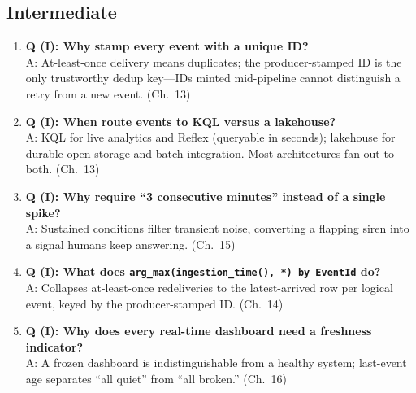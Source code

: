 \subsection*{Intermediate}
\begin{enumerate}
    \item \textbf{Q (I): Why stamp every event with a unique ID?}\\
    A: At-least-once delivery means duplicates; the producer-stamped ID is the only trustworthy
    dedup key---IDs minted mid-pipeline cannot distinguish a retry from a new event. (Ch.~13)
    \item \textbf{Q (I): When route events to KQL versus a lakehouse?}\\
    A: KQL for live analytics and Reflex (queryable in seconds); lakehouse for durable open
    storage and batch integration. Most architectures fan out to both. (Ch.~13)
    \item \textbf{Q (I): Why require ``3 consecutive minutes'' instead of a single spike?}\\
    A: Sustained conditions filter transient noise, converting a flapping siren into a signal
    humans keep answering. (Ch.~15)
    \item \textbf{Q (I): What does \texttt{arg\_max(ingestion\_time(), *) by EventId} do?}\\
    A: Collapses at-least-once redeliveries to the latest-arrived row per logical event, keyed
    by the producer-stamped ID. (Ch.~14)
    \item \textbf{Q (I): Why does every real-time dashboard need a freshness indicator?}\\
    A: A frozen dashboard is indistinguishable from a healthy system; last-event age separates
    ``all quiet'' from ``all broken.'' (Ch.~16)
\end{enumerate}

